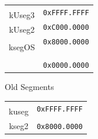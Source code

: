\documentclass[12pt,a4paper,openright,twoside]{report}
\begin{document}
	\begin{figure}[h]
    \centering
    \begin{subfigure}[b]{0.4\textwidth}
        \renewcommand{\arraystretch}{0.70}
        \begin{tabular}{cl}
        \multicolumn{1}{m{3cm}}{} & \multirow{2}{*}{\texttt{0xFFFF.FFFF}} \\ \cline{1-1}
        \multicolumn{1}{|c|}{\multirow{2}{*}{kUseg3}} &  \\
        \multicolumn{1}{|c|}{} & \multirow{2}{*}{\texttt{0xC000.0000}} \\ \cline{1-1}
        \multicolumn{1}{|c|}{\multirow{2}{*}{kUseg2}} &  \\
        \multicolumn{1}{|c|}{} & \multirow{2}{*}{\texttt{0x8000.0000}} \\ \cline{1-1}
        \multicolumn{1}{|c|}{\multirow{8}{*}{ksegOS}} &  \\
        \multicolumn{1}{|c|}{} & \multirow{2}{*}{} \\
        \multicolumn{1}{|c|}{} &  \\
        \multicolumn{1}{|c|}{} & \multirow{2}{*}{} \\
        \multicolumn{1}{|c|}{} &  \\
        \multicolumn{1}{|c|}{} & \multirow{2}{*}{} \\
        \multicolumn{1}{|c|}{} &  \\
        \multicolumn{1}{|c|}{} & \multirow{2}{*}{\texttt{0x0000.0000}} \\ \cline{1-1}
        \multicolumn{1}{l}{} & 
        \end{tabular}
        \caption{Old Segments}
        \label{fig:old_segments}
    \end{subfigure}
    \qquad
    \qquad
    \begin{subfigure}[b]{0.4\textwidth}
        \renewcommand{\arraystretch}{0.70}
        \begin{tabular}{cl}
        \multicolumn{1}{m{3cm}}{} & \multirow{2}{*}{\texttt{0xFFFF.FFFF}} \\ \cline{1-1}
        \multicolumn{1}{|c|}{\multirow{4}{*}{kuseg}} &  \\
        \multicolumn{1}{|c|}{} & \multirow{2}{*}{} \\
        \multicolumn{1}{|c|}{} &  \\
        \multicolumn{1}{|c|}{} & \multirow{2}{*}{\texttt{0x8000.0000}} \\ \cline{1-1}
        \multicolumn{1}{|c|}{\multirow{4}{*}{kseg2}} &  \\

\end{tabular}
\end{subfigure}
\end{figure}
\end{document}
